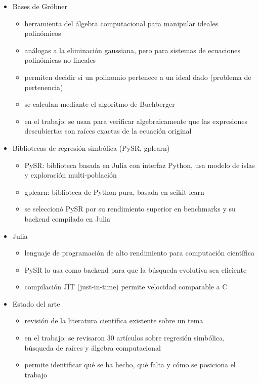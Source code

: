 \documentclass{article}
\begin{document}
\begin{itemize}[leftmargin=1.5em]
  \item Bases de Gröbner
  \begin{itemize}
\item herramienta del álgebra computacional para manipular ideales polinómicos \item análogas a la eliminación gaussiana, pero para sistemas de ecuaciones polinómicas no lineales \item permiten decidir si un polinomio pertenece a un ideal dado (problema de pertenencia) \item se calculan mediante el algoritmo de Buchberger \item en el trabajo: se usan para verificar algebraicamente que las expresiones descubiertas son raíces exactas de la ecuación original
  \end{itemize}

  \item Bibliotecas de regresión simbólica (PySR, gplearn)
  \begin{itemize}
\item PySR: biblioteca basada en Julia con interfaz Python, usa modelo de islas y exploración multi-población \item gplearn: biblioteca de Python pura, basada en scikit-learn \item se seleccionó PySR por su rendimiento superior en benchmarks y su backend compilado en Julia
  \end{itemize}

  \item Julia
  \begin{itemize}
\item lenguaje de programación de alto rendimiento para computación científica \item PySR lo usa como backend para que la búsqueda evolutiva sea eficiente \item compilación JIT (just-in-time) permite velocidad comparable a C
  \end{itemize}

  \item Estado del arte
  \begin{itemize}
\item revisión de la literatura científica existente sobre un tema \item en el trabajo: se revisaron 30 artículos sobre regresión simbólica, búsqueda de raíces y álgebra computacional \item permite identificar qué se ha hecho, qué falta y cómo se posiciona el trabajo
  \end{itemize}

\end{itemize}
\end{document}
